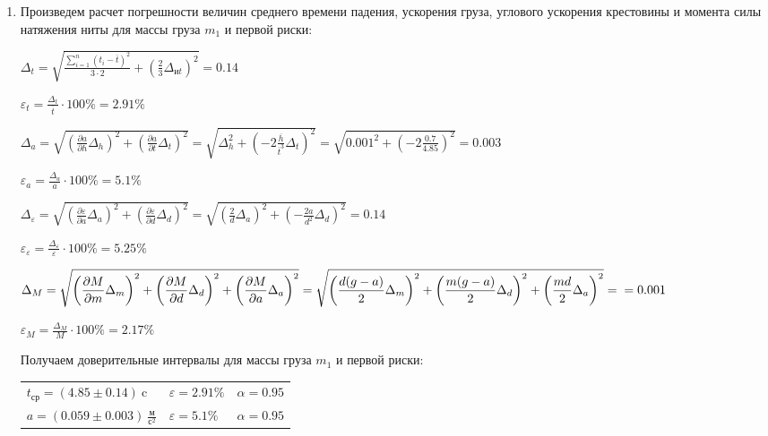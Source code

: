 \begin{enumerate}
    \item Произведем расчет погрешности величин среднего времени падения, ускорения груза, углового ускорения крестовины и момента силы натяжения ниты для массы груза $m_1$ и первой риски:

    $\displaystyle \Delta_t = \sqrt{\frac{\sum_{i = 1}^n (t_i - \overline{t})^2}{3 \cdot 2} + (\frac{2}{3}\Delta_{\text{и}t})^2} = 0.14$

    $\displaystyle \varepsilon_t = \frac{\Delta_t}{\overline{t}} \cdot 100\% = 2.91\%$

    $\displaystyle \Delta_a = \sqrt{\left(\frac{\partial a}{\partial h}\Delta_h\right)^2 + \left(\frac{\partial a}{\partial t} \Delta_t\right)^2} = 
    \sqrt{\Delta_h^2 + \left(-2\frac{\overline{h}}{\overline{t}^3} \Delta_t\right)^2} = \sqrt{0.001^2 + \left(-2\frac{0.7}{4.85}\right)^2} = 0.003$

    $\displaystyle \varepsilon_a = \frac{\Delta_a}{a} \cdot 100\% = 5.1\%$

    $\displaystyle \Delta_\varepsilon = \sqrt{\left(\frac{\partial \varepsilon}{\partial a}\Delta_a\right)^2 + \left(\frac{\partial \varepsilon}{\partial d}\Delta_d\right)^2} = 
    \sqrt{\left(\frac{2}{d}\Delta_a\right)^2 + \left(-\frac{2a}{d^2}\Delta_d\right)^2} = 0.14$

    $\displaystyle \varepsilon_\varepsilon = \frac{\Delta_\varepsilon}{\varepsilon} \cdot 100\% = 5.25\%$

    $\displaystyle \Delta_M = \sqrt{\left(\frac{\partial M}{\partial m}\Delta_m\right)^2 + \left(\frac{\partial M}{\partial d}\Delta_d\right)^2 + \left(\frac{\partial M}{\partial a}\Delta_a\right)^2} = 
    \sqrt{\left(\frac{d(g - a)}{2}\Delta_m\right)^2 + \left(\frac{m(g - a)}{2}\Delta_d\right)^2 + \left(\frac{md}{2}\Delta_a\right)^2} = \\ = 0.001$

    $\displaystyle \varepsilon_M = \frac{\Delta_M}{M} \cdot 100\% = 2.17\%$

    Получаем доверительные интервалы для массы груза $m_1$ и первой риски:

    \begin{tabular}{lll}
        $t_\text{ср} = (4.85 \pm 0.14) \ \text{c}$ & $\varepsilon = 2.91\%$ & $\alpha = 0.95$ \\

        $a = (0.059 \pm 0.003) \ \frac{\text{м}}{\text{с}^2}$ & $\varepsilon = 5.1\%$ & $\alpha = 0.95$ \\


\end{tabular}
\end{enumerate}
